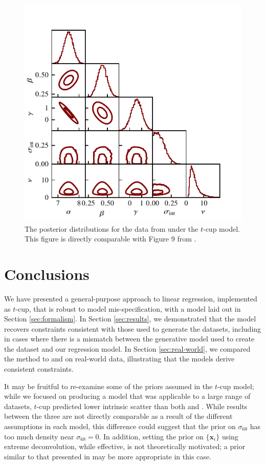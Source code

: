 \documentclass[fleqn,usenatbib]{rasti}
\begin{document}
\begin{figure}
    \includegraphics[width=\columnwidth]{graphics/real/corner_park_fwhm.pdf}
    \caption{The posterior distributions for the data from \citet{Park:2017}
    under the $t$-cup model. This figure is directly comparable with Figure 9 from \citet{Park:2017}.}
    \label{fig:real-world.park.corner}
\end{figure}

\section{Conclusions}
\label{sec:conclusion}

We have presented a general-purpose approach to linear regression, implemented
as $t$-cup, that is robust to model mis-specification, with a model laid out in
Section \ref{sec:formalism}. In Section \ref{sec:results}, we demonstrated that
the model recovers constraints consistent with those used to generate the
datasets, including in cases where there is a mismatch between the generative
model used to create the dataset and our regression model. In Section
\ref{sec:real-world}, we compared the method to \citet{Kelly:2007} and
\citet{Park:2017} on real-world data, illustrating that the models derive
consistent constraints.

It may be fruitful to re-examine some of the priors assumed in the $t$-cup
model; while we focused on producing a model that was applicable to a large
range of datasets, $t$-cup predicted lower intrinsic scatter than both
\citet{Kelly:2007} and \citet{Park:2017}. While results between the three are
not directly comparable as a result of the different assumptions in each model,
this difference could suggest that the prior on $\sigma_{68}$ has too much
density near $\sigma_{68} = 0$. In addition, setting the prior on
$\{\mathbf{x}_i\}$ using extreme deconvolution, while effective, is not
theoretically motivated; a prior similar to that presented in
\citet{Bartlett:2023} may be more appropriate in this case.
\end{document}
